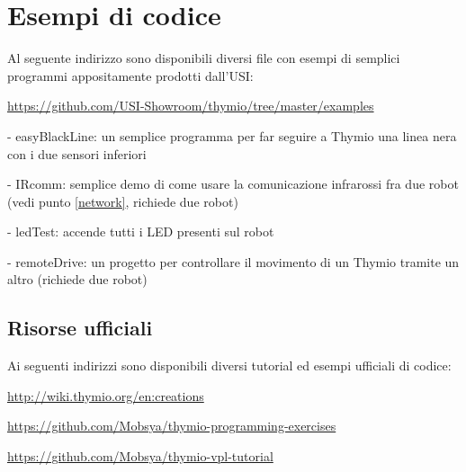 \documentclass[12pt]{article}
\begin{document}
\section{Esempi di codice}\label{usiRepo}
		
		Al seguente indirizzo sono disponibili diversi file con esempi di semplici programmi appositamente prodotti dall'USI:
		
		\url{https://github.com/USI-Showroom/thymio/tree/master/examples}
		
		
		- easyBlackLine: un semplice programma per far seguire a Thymio una linea nera con i due sensori inferiori
		
		- IRcomm: semplice demo di come usare la comunicazione infrarossi fra due robot (vedi punto \ref{network}, richiede due robot)
		
		- ledTest: accende tutti i LED presenti sul robot
		
		- remoteDrive: un progetto per controllare il movimento di un Thymio tramite un altro (richiede due robot)
		
		\newpage
		
	
	\subsection{Risorse ufficiali}
	
		Ai seguenti indirizzi sono disponibili diversi tutorial ed esempi ufficiali di codice:
	
		\url{http://wiki.thymio.org/en:creations}
		
		\url{https://github.com/Mobsya/thymio-programming-exercises}
		
		\url{https://github.com/Mobsya/thymio-vpl-tutorial}
	
	
\end{document}
